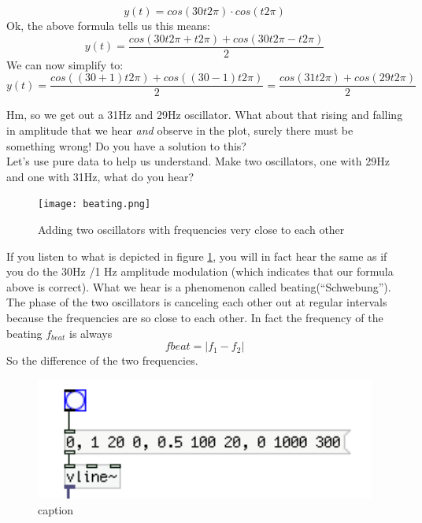 \begin{equation}
	y(t) = cos(30t2\pi) \cdot cos(t2\pi)
\end{equation}
Ok, the above formula tells us this means:
\begin{equation}
	y(t) = \frac{cos(30t2\pi+t2\pi)+cos(30t2\pi-t2\pi)}{2}
\end{equation}
We can now simplify to:
\begin{equation}
	y(t) = \frac{cos((30+1)t2\pi)+cos((30-1)t2\pi)}{2} = \frac{cos(31t2\pi)+cos(29t2\pi)}{2}
\end{equation}

Hm, so we get out a 31Hz and 29Hz oscillator. What about that rising and falling in amplitude that we hear \textit{and} observe in the plot, surely there must be something wrong! Do you have a solution to this?\\

Let's use pure data to help us understand. Make two oscillators, one with 29Hz and one with 31Hz, what do you hear?

\begin{figure}[h!]
	\centering
	\texttt{[image: beating.png]}
	\caption[adding two oscillators]
	{Adding two oscillators with frequencies very close to each other}
	\label{fig:beating}
\end{figure}

If you listen to what is depicted in figure \ref{fig:beating}, you will in fact hear the same as if you do the 30Hz /1 Hz amplitude modulation (which indicates that our formula above is correct). What we hear is a phenomenon called beating(``Schwebung''). The phase of the two oscillators is canceling each other out at regular intervals because the frequencies are so close to each other. In fact the frequency of the beating $f_{beat}$ is always
\begin{equation}
	f{beat}=|f_1-f_2|
\end{equation}
So the difference of the two frequencies.



\begin{figure}[H]
	\begin{center}
		\includegraphics[width = 14cm]{img/simpleEnv.png}
		\caption{caption}
		\label{fig:name}
	\end{center}
\end{figure}

